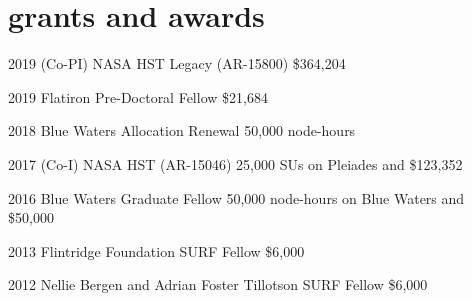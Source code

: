 \documentclass[]{luger-cv} %
\begin{document}

\section{grants and awards}

\begin{entrylist}

\entry
{2019}
{(Co-PI) NASA HST Legacy (AR-15800)}
{\$364,204}
{%
\vspace*{-0.75em}
}

\entry
{2019}
{Flatiron Pre-Doctoral Fellow}
{\$21,684}
{%
\vspace*{-0.75em}
}


\entry
{2018}
{Blue Waters Allocation Renewal}
{50,000 node-hours}
{%
\vspace*{-0.75em}
}


\entry
{2017}
{(Co-I) NASA HST (AR-15046)}
{25,000 SUs on Pleiades and \$123,352}
{%
\vspace*{-0.75em}
}


\entry
{2016}
{Blue Waters Graduate Fellow}
{50,000 node-hours on Blue Waters and \$50,000}
{%
\vspace*{-0.75em}
}


\ifdefined \onepage \else
\entry
{2013}
{Flintridge Foundation SURF Fellow}
{\$6,000}
{%
\vspace*{-0.75em}}

\entry
{2012}
{Nellie Bergen and Adrian Foster Tillotson SURF Fellow}
{\$6,000}
{\vspace*{-0.75em}}
\fi


\end{entrylist}

\end{document}
